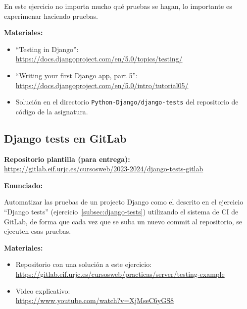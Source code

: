 En este ejercicio no importa mucho qué pruebas se hagan, lo importante es experimenar haciendo pruebas.

\textbf{Materiales:}

\begin{itemize}
\item ``Testing in Django'': \\
  \url{https://docs.djangoproject.com/en/5.0/topics/testing/}

\item ``Writing your first Django app, part 5'': \\
\url{https://docs.djangoproject.com/en/5.0/intro/tutorial05/}

\item Solución en el directorio \texttt{Python-Django/django-tests} del repositorio de código de la asignatura.

\end{itemize}

\subsection{Django tests en GitLab}
\label{subsec:django-tests-gitlab}

\textbf{Repositorio plantilla (para entrega):} \\
\url{https://gitlab.eif.urjc.es/cursosweb/2023-2024/django-tests-gitlab}

\textbf{Enunciado:}

Automatizar las pruebas de un projecto Django como el descrito en el ejercicio ``Django tests'' (ejercicio~\ref{subsec:django-tests}) utilizando el sistema de CI de GitLab, de forma que cada vez que se suba un nuevo commit al repositorio, se ejecuten esas pruebas.


\textbf{Materiales:}

\begin{itemize}
\item Repositorio con una solución a este ejercicio: \\
  \url{https://gitlab.eif.urjc.es/cursosweb/practicas/server/testing-example}
\item Video explicativo: \\
  \url{https://www.youtube.com/watch?v=XjMseC6yGS8}
\end{itemize}


